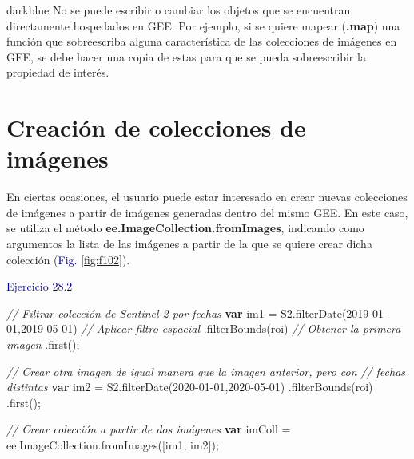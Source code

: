\documentclass[
  12pt,
  letterpaper,
  twoside]{book}
\newenvironment{Shaded}{\begin{snugshade}}{\end{snugshade}}
\newcommand{\AttributeTok}[1]{\textcolor[rgb]{0.48,0.12,0.64}{#1}}
\newcommand{\CommentTok}[1]{\textcolor[rgb]{0.24,0.58,0.00}{\textit{#1}}}
\newcommand{\ControlFlowTok}[1]{\textcolor[rgb]{0.00,0.00,0.00}{\textbf{#1}}}
\newcommand{\FunctionTok}[1]{\textcolor[rgb]{0.48,0.12,0.64}{#1}}
\newcommand{\KeywordTok}[1]{\textcolor[rgb]{0.48,0.12,0.64}{#1}}
\newcommand{\NormalTok}[1]{#1}
\newcommand{\OperatorTok}[1]{\textcolor[rgb]{0.00,0.00,0.00}{#1}}
\newcommand{\StringTok}[1]{\textcolor[rgb]{0.87,0.29,0.22}{#1}}
\newcommand\boldpurple[1]{\textcolor{darkpurple}{\textbf{#1}}}
\begin{document}
\begin{bluebox2}

\begin{awesomeblock}{5pt}{\faLightbulb}{darkblue}
No se puede escribir o cambiar los objetos que se encuentran directamente hospedados en GEE. Por ejemplo, si se quiere mapear (\boldpurple{.map}) una función que sobreescriba alguna característica de las colecciones de imágenes en GEE, se debe hacer una copia de estas para que se pueda sobreescribir la propiedad de interés.

\end{awesomeblock}

\end{bluebox2}

\hypertarget{creaciuxf3n-de-colecciones-de-imuxe1genes}{%
\section{Creación de colecciones de imágenes}\label{creaciuxf3n-de-colecciones-de-imuxe1genes}}

En ciertas ocasiones, el usuario puede estar interesado en crear nuevas colecciones de imágenes a partir de imágenes generadas dentro del mismo GEE. En este caso, se utiliza el método \boldpurple{ee.ImageCollection.fromImages}, indicando como argumentos la lista de las imágenes a partir de la que se quiere crear dicha colección (\textcolor{darkblue}{Fig.} \ref{fig:f102}).

\textcolor{darkblue}{Ejercicio 28.2}

\begin{Shaded}
\begin{Highlighting}[]
\CommentTok{// Filtrar colección de Sentinel{-}2 por fechas}
\ControlFlowTok{var}\NormalTok{ im1 }\OperatorTok{=}\NormalTok{ S2}\OperatorTok{.}\FunctionTok{filterDate}\NormalTok{(}\StringTok{\textquotesingle{}2019{-}01{-}01\textquotesingle{}}\OperatorTok{,}\StringTok{\textquotesingle{}2019{-}05{-}01\textquotesingle{}}\NormalTok{)}
  \CommentTok{// Aplicar filtro espacial}
 \OperatorTok{.}\FunctionTok{filterBounds}\NormalTok{(roi)}
 \CommentTok{// Obtener la primera imagen}
 \OperatorTok{.}\FunctionTok{first}\NormalTok{()}\OperatorTok{;}

\CommentTok{// Crear otra imagen de igual manera que la imagen anterior, pero con }
\CommentTok{// fechas distintas}
\ControlFlowTok{var}\NormalTok{ im2 }\OperatorTok{=}\NormalTok{ S2}\OperatorTok{.}\FunctionTok{filterDate}\NormalTok{(}\StringTok{\textquotesingle{}2020{-}01{-}01\textquotesingle{}}\OperatorTok{,}\StringTok{\textquotesingle{}2020{-}05{-}01\textquotesingle{}}\NormalTok{)}
 \OperatorTok{.}\FunctionTok{filterBounds}\NormalTok{(roi)}
 \OperatorTok{.}\FunctionTok{first}\NormalTok{()}\OperatorTok{;}

\CommentTok{// Crear colección a partir de dos imágenes}
\ControlFlowTok{var}\NormalTok{ imColl }\OperatorTok{=} \KeywordTok{ee}\OperatorTok{.}\AttributeTok{ImageCollection}\OperatorTok{.}\FunctionTok{fromImages}\NormalTok{([im1}\OperatorTok{,}\NormalTok{ im2])}\OperatorTok{;}
\end{Highlighting}
\end{Shaded}
\end{document}
